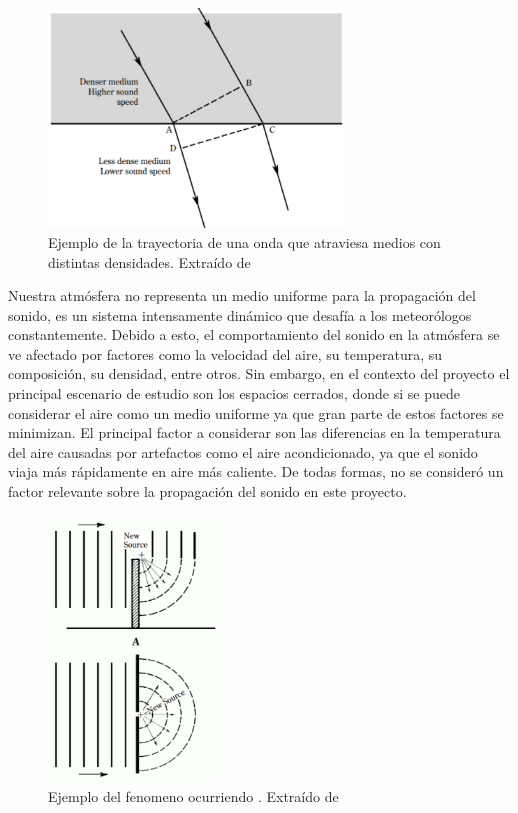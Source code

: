 \documentclass{prgrado}
\begin{document}
\begin{figure}[h!]
    \centering
    \includegraphics[width=0.7\textwidth]{figs/refraction.png}
    \captionsetup{justification=centering}
    \caption{Ejemplo de la trayectoria de una onda que atraviesa medios con distintas densidades. Extraído de \cite{Everest}}
    \label{fig:refraccion}
\end{figure}

Nuestra atmósfera no representa un medio uniforme para la propagación del sonido, es un sistema intensamente dinámico que desafía a los meteorólogos constantemente. Debido a esto, el comportamiento del sonido en la atmósfera se ve afectado por factores como la velocidad del aire, su temperatura, su composición, su densidad, entre otros. Sin embargo, en el contexto del proyecto el principal escenario de estudio son los espacios cerrados, donde si se puede considerar el aire como un medio uniforme ya que gran parte de estos factores se minimizan. El principal factor a considerar son las diferencias en la temperatura del aire causadas por artefactos como el aire acondicionado, ya que el sonido viaja más rápidamente en aire más caliente. De todas formas, no se consideró un factor relevante sobre la propagación del sonido en este proyecto.
\newpage %
\begin{figure}
    \centering
    \includegraphics[width=0.4\textwidth]{figs/diffraction.png}
    \captionsetup{justification=centering}
    \caption{Ejemplo del fenomeno ocurriendo . Extraído de \cite{Everest}}
    \label{fig:difraccion}
\end{figure}
\end{document}
